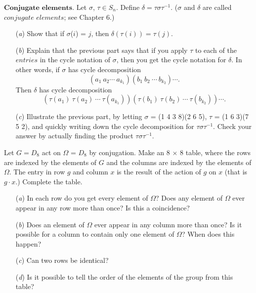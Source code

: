 \documentclass[12pt,letterpaper,boxed]{hmcpset}
\begin{document}
\begin{problem}[3.1.9]
$\textbf{Conjugate elements.}$ Let $\sigma$, $\tau \in S_n$. Define $\delta = \tau \sigma \tau^{-1}$. ($\sigma$ and $\delta$ are called $\textit{conjugate elements}$; see Chapter 6.)
\begin{itemize}
  \item[(\textit{a})] Show that if $\sigma$($i$) = $j$, then $\delta(\tau(i)) = \tau(j)$.
  
  \item[(\textit{b})] Explain that the previous part says that if you apply $\tau$ to each of the $\textit{entries}$ in the cycle notation of $\sigma$, then you get the cycle notation for $\delta$. In other words, if $\sigma$ has cycle decomposition $$(a_1 \ a_2 \cdots \ a_{k_1})(b_1 \ b_2 \ \cdots \ b_{k_2}) \cdots .$$ Then $\delta$ has cycle decomposition $$(\tau(a_1) \ \tau(a_2) \ \cdots \ \tau(a_{k_1}))(\tau(b_1) \ \tau(b_2) \ \cdots \ \tau(b_{k_2})) \cdots.$$
  
  \item[(\textit{c})] Illustrate the previous part, by letting $\sigma$ = (1 4 3 8)(2 6 5), $\tau$ = (1 6 3)(7 5 2), and quickly writing down the cycle decomposition for $\tau \sigma \tau^{-1}$. Check your answer by actually finding the product $\tau \sigma \tau^{-1}$.
\end{itemize}
\end{problem}

\begin{solution}
\end{solution}

\clearpage


\begin{problem}[4.1.7]
Let $G = D_8$ act on $\Omega$ = $D_8$ by conjugation. Make an 8 $\times$ 8 table, where the rows are indexed by the elements of $G$ and the columns are indexed by the elements of $\Omega$. The entry in row $g$ and column $x$ is the result of the action of $g$ on $x$ (that is $g \cdot x$.) Complete the table. 
\begin{itemize}
  \item[(\textit{a})] In each row do you get every element of $\Omega$? Does any element of $\Omega$ ever appear in any row more than once? Is this a coincidence?
  
  \item[(\textit{b})] Does an element of $\Omega$ ever appear in any column more than once? Is it possible for a column to contain only one element of $\Omega$? When does this happen?
  
  \item[(\textit{c})] Can two rows be identical?
  
  \item[(\textit{d})] Is it possible to tell the order of the elements of the group from this table?
\end{itemize}
\end{problem}
\end{document}
